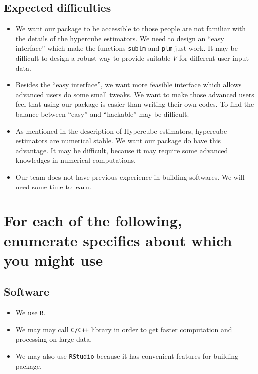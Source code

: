 \documentclass[draft]{article}
\begin{document}
\subsection{Expected difficulties}
\begin{itemize}

	\item We want our package to be accessible to those people are not familiar with the details of the hypercube estimators. We need to design an ``easy interface'' which make the functions {\tt sublm} and {\tt plm} just work. It may be difficult to design a robust way to provide suitable $V$ for different user-input data.

	\item Besides the ``easy interface'', we want more feasible interface which allows advanced users do some small tweaks. We want to make those advanced users feel that using our package is easier than writing their own codes. To find the balance between ``easy'' and ``hackable'' may be difficult.

	\item As mentioned in the description of Hypercube estimators, hypercube estimators are numerical stable. We want our package do have this advantage. It may be difficult, because it may require some advanced knowledges in numerical computations.

	\item Our team does not have previous experience in building softwares. We will need some time to learn.

\end{itemize}


\section{For each of the following, enumerate specifics about which you might use}


\subsection{Software}
\begin{itemize}
	\item We use {\tt R}.
	\item We may may call {\tt C/C++} library in order to get faster computation and processing on large data.
	\item We may also use \texttt{RStudio} because it has convenient features for building package.
\end{itemize}
\end{document}
